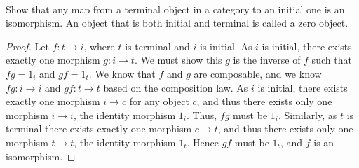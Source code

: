 \documentclass[main.tex]{subfiles}
\begin{document}
\paragraph{}
\begin{exercise}
	Show that any map from a terminal object in a category to an initial one is
	an isomorphism.  An object that is both initial and terminal is called a
	zero object.
\end{exercise}

\begin{proof}
	Let $f\colon t \rightarrow i$, where $t$ is terminal and $i$ is initial. As
	$i$ is initial, there exists exactly one morphism $g\colon i \rightarrow t$.
	We must show this $g$ is the inverse of $f$ such that $fg = 1_i$ and $gf =
	1_t$. We know that $f$ and $g$ are composable, and we know $fg\colon i
	\rightarrow i$ and $gf\colon t \rightarrow t$ based on the composition law.
	As $i$ is initial, there exists exactly one morphism $i \rightarrow c$ for
	any object $c$, and thus there exists only one morphism $i \rightarrow i$,
	the identity morphism $1_i$. Thus, $fg$ must be $1_i$. Similarly, as $t$
	is terminal there exists exactly one morphism $c \rightarrow t$, and thus
	there exists only one morphism $t \rightarrow t$, the identity morphism
	$1_t$. Hence $gf$ must be $1_t$, and $f$ is an isomorphism.
\end{proof}
\end{document}
